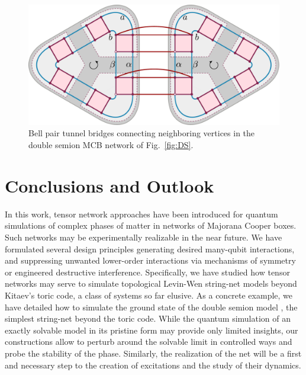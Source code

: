 \documentclass[twocolumn,floats,prx,showpacs]{revtex4-1}
\begin{document}

\begin{figure}
\includegraphics[width=0.9\columnwidth]{fig/tworing.pdf}
\caption{Bell pair tunnel bridges 
connecting neighboring vertices in the double semion MCB network of Fig.~\ref{fig:DS}.  }
\label{fig:tworings}
\end{figure}

\section{Conclusions and Outlook}\label{sec5}

In this work, tensor network approaches have been introduced for quantum simulations of complex phases of matter in networks of Majorana Cooper boxes.  Such networks may be experimentally realizable in the near future. We have formulated several design principles generating desired  many-qubit interactions, and suppressing unwanted lower-order interactions via mechanisms of symmetry or engineered destructive interference. 
Specifically, we have studied how tensor networks may serve to simulate topological Levin-Wen string-net models \cite{Levin2005,Wen2017} beyond Kitaev's toric code, a class of systems so far elusive.   As a concrete  example, we have detailed how to simulate the ground state of the double semion model \cite{Levin2005}, the  simplest string-net beyond the toric code.  While the quantum simulation of an exactly solvable model in its pristine form may  provide only limited insights,  our constructions  allow to perturb around the solvable limit in controlled ways and probe the stability of the phase. Similarly, the realization of the net will be a first and necessary step to the creation of excitations and the study of their dynamics.
\end{document}
